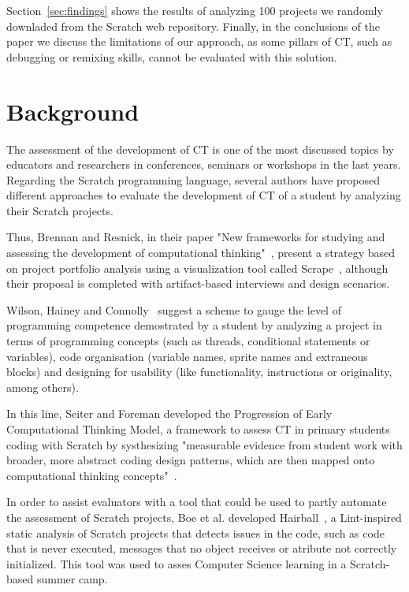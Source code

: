 \documentclass[a4paper,11pt]{article}
\begin{document}
Section~\ref{sec:findings} shows the results of analyzing 100 projects we randomly downladed from the Scratch web repository. Finally, in the conclusions of the paper we discuss the limitations of our approach, as some pillars of CT, such as debugging or remixing skills, cannot be evaluated with this solution.


\section{Background}
\label{sec:background}
The assessment of the development of CT is one of the most discussed topics by educators and researchers in conferences, seminars or workshops in the last years. Regarding the Scratch programming language, several authors have proposed different approaches to evaluate the development of CT of a student by analyzing their Scratch projects. 

Thus, Brennan and Resnick, in their paper "New frameworks for studying and assessing the development of computational thinking"~\cite{brennan2012new}, present a strategy based on project portfolio analysis using a visualization tool called Scrape~\cite{wolz2011scrape}, although their proposal is completed with artifact-based interviews and design scenarios.

Wilson, Hainey and Connolly~\cite{wilson2012evaluation} suggest a scheme to gauge the level of programming competence demostrated by a student by analyzing a project in terms of programming concepts (such as threads, conditional statements or variables), code organisation (variable names, sprite names and extraneous blocks) and designing for usability (like functionality, instructions or originality, among others).

In this line, Seiter and Foreman developed the Progression of Early Computational Thinking Model, a framework to assess CT in primary students coding with Scratch by systhesizing "measurable evidence from student work with broader, more abstract coding design patterns, which are then mapped onto computational thinking concepts"~\cite{seiter2013modeling}.

In order to assist evaluators with a tool that could be used to partly automate the assessment of Scratch projects, Boe et al. developed Hairball~\cite{boe2013hairball}, a Lint-inspired static analysis of Scratch projects that detects issues in the code, such as code that is never executed, messages that no object receives or atribute not correctly initialized. This tool was used to asses Computer Science learning in a Scratch-based summer camp\cite{franklin2013assessment}. 
\end{document}
